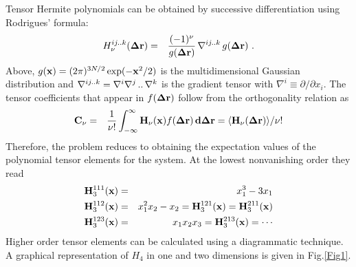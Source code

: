 \documentclass[12pt,article]{iopart}
\begin{document}
Tensor Hermite polynomials can be
obtained by successive differentiation using Rodrigues' formula:
\begin{eqnarray}
\label{Rodrigues}
H_{\nu}^{ij..k}({\bf \Delta r}) &=& \frac{(-1)^\nu}{g({\bf
    \Delta r})}\,{\bf\nabla}^{ij..k}\,g({\bf \Delta r})\ .
\end{eqnarray}
Above, $g({\bf x}) = (2\pi)^{3N/2}\exp(-{\bf x}^2/2)$ is the
multidimen{\-}sional Gaussian distribution and ${\bf \nabla}^{ij..k} =
\nabla^i\nabla^j\,..\,\nabla^k$ is the gradient tensor with
$\nabla^i \equiv \partial/\partial x_i$.
The tensor coefficients that appear in $f({\bf \Delta r})$
follow from the orthogonality relation as
\begin{eqnarray} 
\label{coefs}
{\bf C}_\nu &=& \frac{1}{\nu!}\int_{-\infty}^{\infty} {\bf H}_\nu({\bf x})
f({\bf\Delta r})\, {\bf d\Delta r} =  \langle {\bf H}_\nu({\bf\Delta r})\rangle/\nu!
\label{eqn:orthogonality}
\end{eqnarray}
Therefore, the problem reduces to obtaining the expectation values of
the polynomial tensor elements for the system. At the lowest
nonvanishing order they read
\begin{eqnarray}
\label{H3}
{\bf H}_3^{111}({\bf x}) &=& x_1^3 -3x_1 \nonumber \\
{\bf H}_3^{112}({\bf x}) &=& x_1^2x_2 -x_2 = {\bf H}_3^{121}({\bf x}) = {\bf
  H}_3^{211}({\bf x}) \nonumber \\
{\bf H}_3^{123}({\bf x}) &=& x_1x_2x_3 = {\bf H}_3^{213}({\bf x}) = \cdots
\end{eqnarray}
Higher order tensor elements can be calculated using a diagrammatic technique.
A graphical representation of $H_4$ in one and two dimensions is given in Fig.\ref{Fig1}. 
\end{document}
